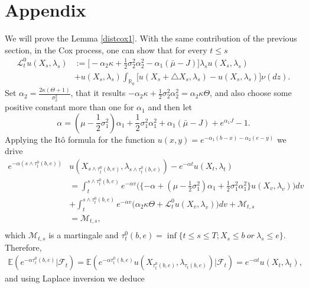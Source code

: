 \documentclass[11pt]{article}
\numberwithin{equation}{section}
\begin{document}
\section{Appendix}
We will prove the Lemma \ref{distcox1}. With the same contribution of the previous section, in the Cox process,  one can show that for every $t \leq s$
\begin{align*}
\mathcal{L}_t^0 u(X_s, \lambda_s)
&:= \Big[ -\alpha_2 \kappa +\frac12 \sigma_2^2 \alpha_2^2-\alpha_1 (\bar{\mu}-J)\Big]\lambda_s u(X_s,\lambda_s)\\
&+ u(X_s,\lambda_s)\int_{\mathbb{R}_0} \Big[ u(X_s+\triangle X_s, \lambda_s)-u(X_s,\lambda_s)\Big]\nu(dz).
\end{align*}
Set $\alpha_2 = \frac{2\kappa (\Theta +1)}{\sigma_2^2}$, that it results $ -\alpha_2 \kappa +\frac12 \sigma_2^2 \alpha_2^2 =\alpha_2 \kappa \Theta$, and also choose some positive constant more than one for $\alpha_1$ and then let  $$\alpha= (\mu-\frac12 \sigma_1^2) \alpha_1 +\frac12 \sigma_1^2\alpha_1^2 +\alpha_1 (\bar{\mu}-J)+e^{\alpha_1 J}-1.$$ 
Applying the It\^o formula for the function $u(x,y)=e^{-\alpha_1(b-x)-\alpha_2(e-y)}$ we drive
\begin{align}
e^{-\alpha ({s\wedge{\tau}_{t}^0 (b,e)})} & u(X_{s\wedge{\tau}_{t}^0(b,e)}, \lambda_{s \wedge{\tau}_{t}^0(b,e)}) -e^{-\alpha t} u(X_{t}, \lambda_{t}) \nonumber\\
&  = \int_t^{s \wedge{\tau}_{t}^0(b,e)} e^{-\alpha v}\Big(\{-\alpha+(\mu-\frac12 \sigma_1^2)\alpha_1+ \frac12  \sigma_1^2\alpha_1^2\} u(X_v,\lambda_v)\Big) dv\nonumber\\
&+  \int_t^{s \wedge{\tau}_{t}^0(b,e)}  e^{-\alpha v}\Big(\alpha_2 \kappa \Theta+ \mathcal{L}_t^0 u(X_v,\lambda_v)\Big) dv +\mathcal{M}_{t,s}\nonumber\\
&= \mathcal{M}_{t,s},\nonumber\\
\end{align}
which $\mathcal{M}_{t,s}$ is a martingale and ${\tau}_{t}^0 (b,e)= \inf\{t \leq s \leq T;  X_s \leq b~ or~ \lambda_s \leq e\}$. 
Therefore, 
\begin{align*}
\mathbb{E}(e^{-\alpha {\tau}_{t}^0(b,e)}\vert \mathcal{F}_t)= \mathbb{E}(e^{-\alpha {{\tau}_{t}^0(b,e)}} u(X_{{\tau}_{t}^0(b,e)}, \lambda_{{\tau}_{t}(b,e)}) \vert \mathcal{F}_t) =e^{-\alpha t} u(X_{t}, \lambda_{t}),
\end{align*}
and using Laplace inversion we deduce
\end{document}
